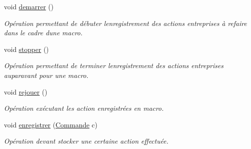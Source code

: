 \begin{DoxyCompactItemize}
\item 
\mbox{\label{interfacefr_1_1istic_1_1m1_1_1aco_1_1miniediteur_1_1v1_1_1Enregistreur_a9570ac8bcb44dd208e6f0e3e4db47d15}} 
void \hyperlink{interfacefr_1_1istic_1_1m1_1_1aco_1_1miniediteur_1_1v1_1_1Enregistreur_a9570ac8bcb44dd208e6f0e3e4db47d15}{demarrer} ()
\begin{DoxyCompactList}\small\item\em Opération permettant de débuter l\textquotesingle{}enregistrement des actions entreprises à refaire dans le cadre d\textquotesingle{}une macro. \end{DoxyCompactList}\item 
\mbox{\label{interfacefr_1_1istic_1_1m1_1_1aco_1_1miniediteur_1_1v1_1_1Enregistreur_a1603b6f922f9ce7520fe292d0ede82f1}} 
void \hyperlink{interfacefr_1_1istic_1_1m1_1_1aco_1_1miniediteur_1_1v1_1_1Enregistreur_a1603b6f922f9ce7520fe292d0ede82f1}{stopper} ()
\begin{DoxyCompactList}\small\item\em Opération permettant de terminer l\textquotesingle{}enregistrement des actions entreprises auparavant pour une macro. \end{DoxyCompactList}\item 
\mbox{\label{interfacefr_1_1istic_1_1m1_1_1aco_1_1miniediteur_1_1v1_1_1Enregistreur_af13847c7dcf76aed6cbac89c94f3ee46}} 
void \hyperlink{interfacefr_1_1istic_1_1m1_1_1aco_1_1miniediteur_1_1v1_1_1Enregistreur_af13847c7dcf76aed6cbac89c94f3ee46}{rejouer} ()
\begin{DoxyCompactList}\small\item\em Opération exécutant les action enregistrées en macro. \end{DoxyCompactList}\item 
void \hyperlink{interfacefr_1_1istic_1_1m1_1_1aco_1_1miniediteur_1_1v1_1_1Enregistreur_a3837fe648c4b3fd41f8746a35dfb9695}{enregistrer} (\hyperlink{interfacefr_1_1istic_1_1m1_1_1aco_1_1miniediteur_1_1v1_1_1Commande}{Commande} c)
\begin{DoxyCompactList}\small\item\em Opération devant stocker une certaine action effectuée. \end{DoxyCompactList}\end{DoxyCompactItemize}


